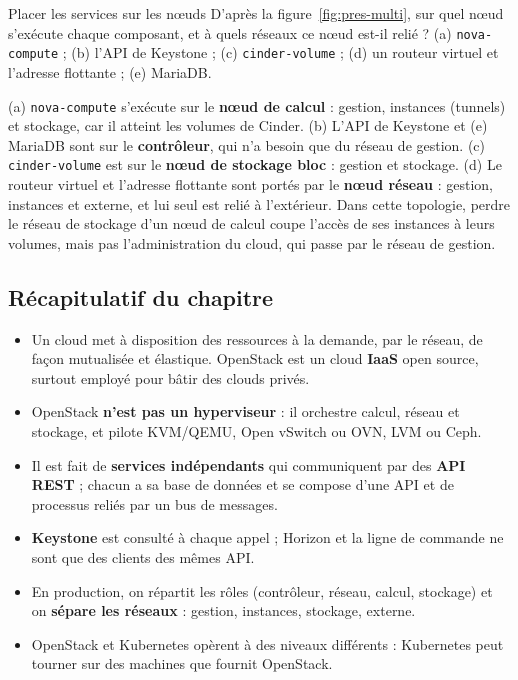 \begin{exercice}{Placer les services sur les nœuds}\label{ex:pres-noeuds}
D'après la figure~\ref{fig:pres-multi}, sur quel nœud s'exécute chaque composant, et à quels réseaux ce nœud est-il relié ?
(a) \texttt{nova-compute} ; (b) l'API de Keystone ; (c) \texttt{cinder-volume} ; (d) un routeur virtuel et l'adresse flottante ;
(e) MariaDB.
\end{exercice}
\begin{correction}
(a) \texttt{nova-compute} s'exécute sur le \textbf{nœud de calcul} : gestion, instances (tunnels) et stockage, car il atteint les
volumes de Cinder. (b) L'API de Keystone et (e) MariaDB sont sur le \textbf{contrôleur}, qui n'a besoin que du réseau de gestion.
(c) \texttt{cinder-volume} est sur le \textbf{nœud de stockage bloc} : gestion et stockage. (d) Le routeur virtuel et l'adresse
flottante sont portés par le \textbf{nœud réseau} : gestion, instances et externe, et lui seul est relié à l'extérieur.
Dans cette topologie, perdre le réseau de stockage d'un nœud de calcul coupe l'accès de ses instances à leurs volumes, mais pas l'administration du cloud,
qui passe par le réseau de gestion.
\end{correction}

\subsection{Récapitulatif du chapitre}\label{sec:pres-recap}

\begin{aretenir}
\begin{itemize}
  \item Un cloud met à disposition des ressources à la demande, par le réseau, de façon mutualisée et élastique. OpenStack est un cloud
        \textbf{IaaS} open source, surtout employé pour bâtir des clouds privés.
  \item OpenStack \textbf{n'est pas un hyperviseur} : il orchestre calcul, réseau et stockage, et pilote KVM/QEMU, Open vSwitch ou OVN,
        LVM ou Ceph.
  \item Il est fait de \textbf{services indépendants} qui communiquent par des \textbf{API REST} ; chacun a sa base de données et se
        compose d'une API et de processus reliés par un bus de messages.
  \item \textbf{Keystone} est consulté à chaque appel ; Horizon et la ligne de commande ne sont que des clients des mêmes API.
  \item En production, on répartit les rôles (contrôleur, réseau, calcul, stockage) et on \textbf{sépare les réseaux} : gestion,
        instances, stockage, externe.
  \item OpenStack et Kubernetes opèrent à des niveaux différents : Kubernetes peut tourner sur des machines que fournit OpenStack.
\end{itemize}
\end{aretenir}

